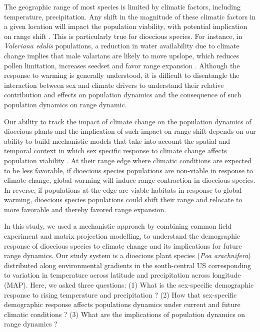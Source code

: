 \documentclass[11pt]{article}
\begin{document}
The geographic range of most species is limited by climatic factors, including temperature, precipitation. 
Any shift in the magnitude of these climatic factors in a given location will impact the population viability, with potential implication on range shift \citep{davis2001range, pease1989model}. 
This is particularly true for dioecious species.
For instance, in \textit{Valeriana edulis} populations, a reduction in water availability due to climate change implies that male valarians are likely to move upslope, which reduces pollen limitation, increases seedset and favor range expansion \citep{petry2016sex}.
Although the response to warming is generally understood, it is difficult to disentangle the interaction between sex and climate drivers to understand their relative contribution and effects on population dynamics and the consequence of such population dynamics on range dynamic. 

Our ability to track the impact of climate change on the population dynamics of dioecious plants and the implication of such impact on range shift depends on our ability to build mechanistic models that take into account the spatial and temporal context in which sex specific response to climate change affects population viability \citep{davis2001range,evans2016towards,czachura2020demographic}.
At their range edge where climatic conditions are expected to be less favorable, if dioecious species populations are non-viable in response to climate change, global warming will induce range contraction in dioecious species.
In reverse, if populations at the edge are viable habitats in response to global warming, dioecious species populations could shift their range and relocate to more favorable and thereby favored range expansion. 

In this study, we used a mechanistic approach by combining common field experiment and matrix projection modelling, to understand the demographic response of dioecious species to climate change and its implications for future range dynamics.
Our study system is a dioecious plant species (\textit{Poa arachnifera}) distributed along environmental gradients in the south-central US corresponding to variation in temperature across latitude and precipitation across longitude (MAP). 
Here, we asked three questions: (1) What is the sex-specific demographic response to rising temperature and precipitation ?
(2) How that sex-specific demographic response affects populations dynamics under current and future climatic conditions ?
(3) What are the implications of population dynamics on range dynamics ?   
\end{document}
